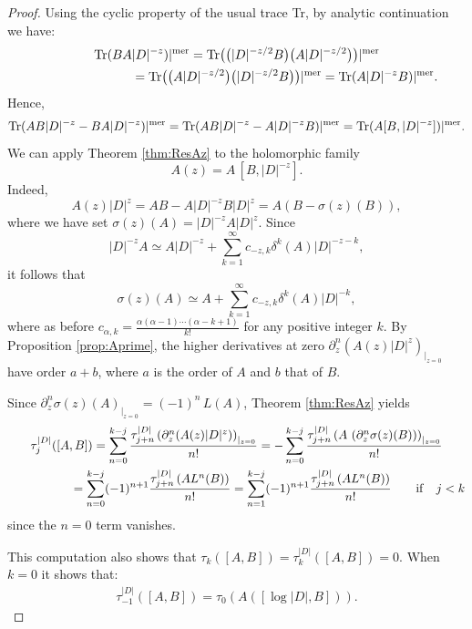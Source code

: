 \begin{proof}  Using the cyclic property of the
usual trace Tr, by analytic continuation we have:
\begin{gather*}
{\rm Tr} (B  A
  \vert D\vert^{-z} )\vert^{\rm mer} = {\rm Tr}\big(\big(\vert D\vert^{-z/2}B\big)  \big(A
  \vert D\vert^{-z/2}\big)\big)\vert^{\rm mer}\\
  \phantom{{\rm Tr} (B  A   \vert D\vert^{-z} )\vert^{\rm mer} }{}
 = {\rm Tr}\big( \big(A
  \vert D\vert^{-z/2}\big) \big( \vert D\vert^{-z/2}B\big)\big)\vert^{\rm mer}
 = {\rm Tr} ( A  \vert D\vert^{-z} B )\vert^{\rm mer}.
\end{gather*} Hence,
\begin{gather*}
{\rm Tr} ( A  B\vert D\vert^{-z}-B  A
  \vert D\vert^{-z} )\vert^{\rm mer} =  {\rm Tr} ( A  B \vert
  D\vert^{-z}-A \vert D\vert^{-z}B )\vert^{\rm mer}
 =  {\rm Tr} ( A [B ,\vert
  D\vert^{-z} ] )\vert^{\rm mer} .
\end{gather*}
We can apply Theorem \ref{thm:ResAz} to the holomorphic family
\[
A(z)= A\, [B, \vert
  D\vert^{-z}].
  \] Indeed,
\[
A(z) \vert
    D\vert^z= A  B -A \vert D\vert^{-z}B \vert
    D\vert^z= A   (B- \sigma(z)(B)),
    \]
where we have set $\sigma(z)(A)= \vert D\vert^{-z}  A \vert
    D\vert^z$. Since
    \[
    \vert D\vert^{-z} A\simeq  A  \vert D\vert^{-z}+
     \sum_{k=1}^\infty c_{-z,k}
\delta^k(A)   \vert D\vert^{-z-k},
\] it follows that
\[
\sigma(z)(A)\simeq A+ \sum_{k=1}^\infty c_{-z,k}
\delta^k(A)   \vert D\vert^{ -k},
\] where as before
 $c_{ \alpha, k}= \frac{\alpha(\alpha-1)\cdots (\alpha-k+1)}{k!}$ for any positive
 integer $k$. By
 Proposition \ref{prop:Aprime}, the  higher derivatives at zero $\partial_z^n (A(z) \vert
    D\vert^z)_{\vert_{z=0}}$  have order $a+b$, where $a$ is the order of $A$
    and $b$ that of $B$.

Since  $\partial^n_z \sigma(z)(A)_{\vert_{z=0}}=
(-1)^n\, L(A)$,   Theorem \ref{thm:ResAz}
    yields
\begin{gather*}
 \tau_j^{\vert D\vert}([A,B]) =  \sum_{n= 0}^{k-j} \frac{\tau_{j+n}^{\vert D\vert} \left(\partial_z^n (A(z)
  \vert D\vert^z)\right)_{\vert_{z=0}}}{n!}
 =  -\sum_{n= 0}^{k-j} \frac{\tau_{j+n}^{\vert D\vert} \left(A\, \left(\partial_z^n \sigma(z)
  (B)\right) \right)_{\vert_{z=0}}}{n!}\\
 \phantom{\tau_j^{\vert D\vert}([A,B])}{}
 =  \sum_{n= 0}^{k-j} (-1)^{n+1}\frac{\tau_{j+n}^{\vert D\vert} \left(
    A L^n(B)\right)}{n!}
 =  \sum_{n=1}^{k-j} (-1)^{n+1}\frac{\tau_{j+n}^{\vert D\vert} \left(
    A L^n(B)\right)}{n!}\qquad{\rm if}\quad j<k
    \end{gather*}
since the $n=0$ term vanishes.

  This computation also shows that $ \tau_k([A,B]) =\tau_k^{\vert D\vert} ([A,B])=0$.  When
  $k=0$ it  shows that:
\begin{gather*}
\tau_{-1}^{\vert D\vert}([A,B ])=\tau_{0}\left( A \left([ \log
    \vert D\vert ,B] \right)\right).\tag*{\qed}
    \end{gather*}\renewcommand{\qed}{}
\end{proof}

